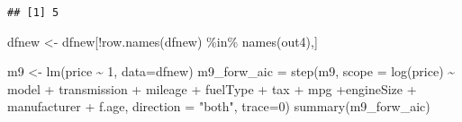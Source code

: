 \documentclass[
]{article}
\newenvironment{Shaded}{\begin{snugshade}}{\end{snugshade}}
\newcommand{\AttributeTok}[1]{\textcolor[rgb]{0.77,0.63,0.00}{#1}}
\newcommand{\DecValTok}[1]{\textcolor[rgb]{0.00,0.00,0.81}{#1}}
\newcommand{\FunctionTok}[1]{\textcolor[rgb]{0.00,0.00,0.00}{#1}}
\newcommand{\NormalTok}[1]{#1}
\newcommand{\OtherTok}[1]{\textcolor[rgb]{0.56,0.35,0.01}{#1}}
\newcommand{\SpecialCharTok}[1]{\textcolor[rgb]{0.00,0.00,0.00}{#1}}
\newcommand{\StringTok}[1]{\textcolor[rgb]{0.31,0.60,0.02}{#1}}
\begin{document}
\begin{verbatim}
## [1] 5
\end{verbatim}

\begin{Shaded}
\begin{Highlighting}[]
\NormalTok{dfnew }\OtherTok{\textless{}{-}}\NormalTok{ dfnew[}\SpecialCharTok{!}\FunctionTok{row.names}\NormalTok{(dfnew) }\SpecialCharTok{\%in\%} \FunctionTok{names}\NormalTok{(out4),]}

\NormalTok{m9 }\OtherTok{\textless{}{-}} \FunctionTok{lm}\NormalTok{(price }\SpecialCharTok{\textasciitilde{}}  \DecValTok{1}\NormalTok{, }\AttributeTok{data=}\NormalTok{dfnew)}
\NormalTok{m9\_forw\_aic }\OtherTok{=} \FunctionTok{step}\NormalTok{(m9,}
\AttributeTok{scope =} \FunctionTok{log}\NormalTok{(price) }\SpecialCharTok{\textasciitilde{}}\NormalTok{  model }\SpecialCharTok{+}\NormalTok{ transmission }\SpecialCharTok{+}\NormalTok{ mileage }\SpecialCharTok{+}\NormalTok{ fuelType }\SpecialCharTok{+}\NormalTok{ tax }\SpecialCharTok{+}\NormalTok{ mpg }\SpecialCharTok{+}\NormalTok{engineSize }\SpecialCharTok{+}\NormalTok{ manufacturer }\SpecialCharTok{+}\NormalTok{ f.age, }\AttributeTok{direction =} \StringTok{"both"}\NormalTok{, }\AttributeTok{trace=}\DecValTok{0}\NormalTok{)}
\FunctionTok{summary}\NormalTok{(m9\_forw\_aic)}
\end{Highlighting}
\end{Shaded}
\end{document}

